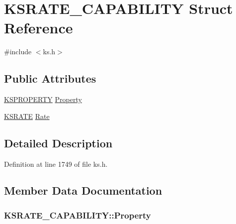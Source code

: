 \hypertarget{struct_k_s_r_a_t_e___c_a_p_a_b_i_l_i_t_y}{}\section{K\+S\+R\+A\+T\+E\+\_\+\+C\+A\+P\+A\+B\+I\+L\+I\+TY Struct Reference}
\label{struct_k_s_r_a_t_e___c_a_p_a_b_i_l_i_t_y}


{\ttfamily \#include $<$ks.\+h$>$}

\subsection*{Public Attributes}
\begin{DoxyCompactItemize}
\item 
\hyperlink{ks_8h_a4392f77c74e868d813d46c39ada4d660}{K\+S\+P\+R\+O\+P\+E\+R\+TY} \hyperlink{struct_k_s_r_a_t_e___c_a_p_a_b_i_l_i_t_y_a109cd73aa2873d34e522f6537a4e7daa}{Property}
\item 
\hyperlink{struct_k_s_r_a_t_e}{K\+S\+R\+A\+TE} \hyperlink{struct_k_s_r_a_t_e___c_a_p_a_b_i_l_i_t_y_a12e47c0b7751655cd43433b0d595521a}{Rate}
\end{DoxyCompactItemize}


\subsection{Detailed Description}


Definition at line 1749 of file ks.\+h.



\subsection{Member Data Documentation}
\subsubsection[{\texorpdfstring{Property}{Property}}]{ K\+S\+R\+A\+T\+E\+\_\+\+C\+A\+P\+A\+B\+I\+L\+I\+T\+Y\+::\+Property}\hypertarget{struct_k_s_r_a_t_e___c_a_p_a_b_i_l_i_t_y_a109cd73aa2873d34e522f6537a4e7daa}{}\label{struct_k_s_r_a_t_e___c_a_p_a_b_i_l_i_t_y_a109cd73aa2873d34e522f6537a4e7daa}


